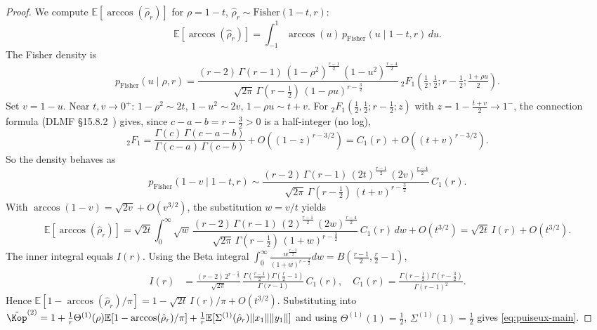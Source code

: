 \begin{proof}
We compute \( \mathbb{E}[\arccos(\hat{\rho}_r)] \) for \( \rho = 1-t \), \( \hat{\rho}_r \sim \text{Fisher}(1-t,r) \):
\[
\mathbb{E}[\arccos(\hat{\rho}_r)] = \int_{-1}^{1} \arccos(u)\, p_{\text{Fisher}}(u \mid 1-t, r)\, du.
\]
The Fisher density is
\[
p_{\text{Fisher}}(u \mid \rho, r) = \frac{(r-2)\,\Gamma(r-1)\,(1-\rho^2)^{\frac{r-1}{2}}\,(1-u^2)^{\frac{r-4}{2}}}{\sqrt{2\pi}\,\Gamma(r-\tfrac{1}{2})\,(1-\rho u)^{r-\frac{3}{2}}}\,{}_2F_1\!\left(\tfrac{1}{2},\tfrac{1}{2}; r-\tfrac{1}{2}; \tfrac{1+\rho u}{2}\right).
\]
Set \( v = 1-u \). Near \( t,v \to 0^+ \): \( 1-\rho^2 \sim 2t \), \( 1-u^2 \sim 2v \), \( 1-\rho u \sim t+v \). For \( {}_2F_1(\tfrac{1}{2},\tfrac{1}{2}; r-\tfrac{1}{2}; z) \) with \( z = 1 - \tfrac{t+v}{2} \to 1^- \), the connection formula (DLMF §15.8.2~\cite{nist_dlmf}) gives, since \( c-a-b = r-\tfrac{3}{2} > 0 \) is a half-integer (no log),
\[
{}_2F_1 = \frac{\Gamma(c)\,\Gamma(c-a-b)}{\Gamma(c-a)\,\Gamma(c-b)} + O((1-z)^{r-3/2}) = C_1(r) + O((t+v)^{r-3/2}).
\]
So the density behaves as
\[
p_{\text{Fisher}}(1-v \mid 1-t, r) \sim \frac{(r-2)\,\Gamma(r-1)\,(2t)^{\frac{r-1}{2}}\,(2v)^{\frac{r-4}{2}}}{\sqrt{2\pi}\,\Gamma(r-\tfrac{1}{2})\,(t+v)^{r-\frac{3}{2}}}\,C_1(r).
\]
With \( \arccos(1-v) = \sqrt{2v} + O(v^{3/2}) \), the substitution \( w = v/t \) yields
\[
\mathbb{E}[\arccos(\hat{\rho}_r)] = \sqrt{2t}\int_0^\infty \sqrt{w}\,\frac{(r-2)\,\Gamma(r-1)\,(2)^{\frac{r-1}{2}}\,(2w)^{\frac{r-4}{2}}}{\sqrt{2\pi}\,\Gamma(r-\tfrac{1}{2})\,(1+w)^{r-\frac{3}{2}}}\,C_1(r)\, dw + O(t^{3/2}) = \sqrt{2t}\,I(r) + O(t^{3/2}).
\]
The inner integral equals \( I(r) \). Using the Beta integral \( \int_0^\infty \frac{w^{\frac{r-3}{2}}}{(1+w)^{r-\frac{3}{2}}} dw = B(\frac{r-1}{2},\frac{r}{2}-1) \),
\begin{align}
\label{eq:I-r-closed-form}
I(r) &= \frac{(r-2)\,2^{r-\frac{5}{2}}}{\sqrt{2\pi}}\,\frac{\Gamma(\frac{r-1}{2})\Gamma(\frac{r}{2}-1)}{\Gamma(r-1)}\,C_1(r), \quad C_1(r) = \frac{\Gamma(r-\tfrac{1}{2})\Gamma(r-\tfrac{3}{2})}{\Gamma(r-1)^2}.
\end{align}
Hence \( \mathbb{E}[1 - \arccos(\hat{\rho}_r)/\pi] = 1 - \sqrt{2t}\,I(r)/\pi + O(t^{3/2}) \). Substituting into \( \tilde{\Kop}^{(2)} = 1 + \frac{1}{r}\Theta^{(1)}(\rho)\mathbb{E}[1-\arccos(\hat{\rho}_r)/\pi] + \frac{1}{r}\mathbb{E}[\Sigma^{(1)}(\hat{\rho}_r)\|x_1\|\|y_1\|] \) and using \( \Theta^{(1)}(1)=\tfrac{1}{2} \), \( \Sigma^{(1)}(1)=\tfrac{1}{2} \) gives \eqref{eq:puiseux-main}.
\end{proof}

